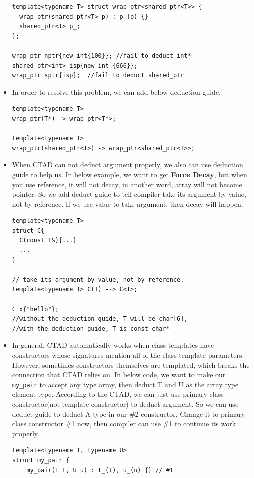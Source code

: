 \documentclass[a4paper,11pt,twoside]{book}
\begin{document}
\begin{itemize}
\begin{lstlisting}
template<typename T> struct wrap_ptr<shared_ptr<T>> {
  wrap_ptr(shared_ptr<T> p) : p_(p) {}
  shared_ptr<T> p_;
};

wrap_ptr nptr{new int{100}}; //fail to deduct int*
shared_ptr<int> isp{new int {666}};
wrap_ptr sptr{isp};  //fail to deduct shared_ptr
\end{lstlisting}

    \item In order to resolve this problem, we can add below deduction guide.

\begin{lstlisting}
template<typename T>
wrap_ptr(T*) -> wrap_ptr<T*>;

template<typename T>
wrap_ptr(shared_ptr<T>) -> wrap_ptr<shared_ptr<T>>;
\end{lstlisting}

	\item When CTAD can not deduct argument properly, we also can use deduction guide to help us. In below example, we want to get \textbf{Force Decay}, but when you use reference, it will not decay, in another word, array will not become pointer. So we add deduct guide to tell compiler take its argument by value, not by reference. If we use value to take argument, then decay will happen.
\begin{lstlisting}
template<typename T>
struct C{
  C(const T&){...}
  ...
}

// take its argument by value, not by reference.
template<typename T> C(T) --> C<T>; 

C x{"hello"};
//without the deduction guide, T will be char[6],
//with the deduction guide, T is const char*
\end{lstlisting}

    \item In general, CTAD automatically works when class templates have constructors whose signatures mention all of the class template parameters. However, sometimes constructors themselves are templated, which breaks the connection that CTAD relies on. In below code, we want to make our \texttt{my\_pair} to accept any type array, then deduct T and U as the array type element type. According to the CTAD, we can just use primary class constructor(not template constructor) to deduct argument. So we can use deduct guide to deduct A type in our \#2 constructor, Change it to primary class constructor \#1 now, then compiler can use \#1 to continue its work properly.

\begin{lstlisting}
template<typename T, typename U>
struct my_pair {
	my_pair(T t, U u) : t_(t), u_(u) {} // #1
  

\end{lstlisting}
\end{itemize}
\end{document}

